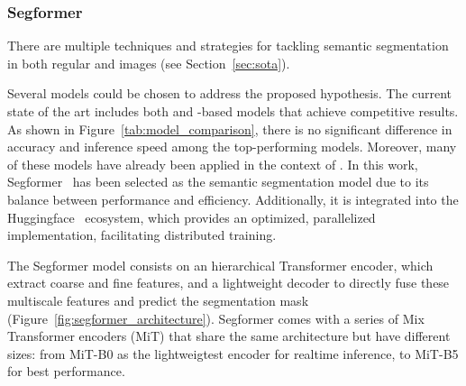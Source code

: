 \subsubsection{Segformer}
There are multiple techniques and strategies for tackling semantic segmentation in both regular and  images (see Section~\ref{sec:sota}).  

Several models could be chosen to address the proposed hypothesis. The current state of the art includes both  and -based models that achieve competitive results. As shown in Figure~\ref{tab:model_comparison}, there is no significant difference in accuracy and inference speed among the top-performing models. Moreover, many of these models have already been applied in the context of . In this work, Segformer~\cite{segformer} has been selected as the semantic segmentation model due to its balance between performance and efficiency. Additionally, it is integrated into the Huggingface~\cite{huggingface} ecosystem, which provides an optimized, parallelized implementation, facilitating distributed training.  

\begin{table}[h]
    \centering
    \caption{Comparison of different models. Results are obtained from \cite{DDRNet} \cite{PIDNet} \cite{segformer}.  }
    \label{tab:model_comparison}
\end{table}


The Segformer model consists on an hierarchical Transformer  encoder, which extract coarse and fine features, and a lightweight  decoder to directly fuse these multiscale features and predict the segmentation mask (Figure~\ref{fig:segformer_architecture}). Segformer comes with a series of Mix Transformer encoders (MiT) that share the same architecture but have different sizes: from MiT-B0 as the lightweigtest encoder for realtime inference, to MiT-B5 for best performance.

